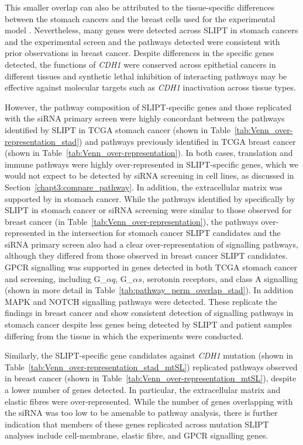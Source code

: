 This smaller overlap can also be attributed to the tissue-specific differences between the stomach cancers and the breast cells used for the experimental model \citep{Chen2014}. Nevertheless, many genes were detected across SLIPT in stomach cancers and the experimental screen \citep{Telford2015} and the pathways detected were consistent with prior observations in breast cancer. Despite differences in the specific genes detected, the functions of \textit{CDH1} were conserved across epithetial cancers in different tissues and synthetic lethal inhibition of interacting pathways may be effective against molecular targets such as \textit{CDH1} inactivation across tissue types.

However, the pathway composition of SLIPT-specific genes and those replicated with the siRNA primary screen \citep{Telford2015} were highly concordant between the pathways identified by SLIPT in TCGA stomach cancer (shown in Table~\ref{tab:Venn_over-representation_stad}) and pathways previously identified in TCGA breast cancer (shown in Table~\ref{tab:Venn_over-representation}). In both cases, translation and immune pathways were highly over-represented in SLIPT-specific genes, which we would not expect to be detected by siRNA screening in cell lines, as discussed in Section~\ref{chapt3:compare_pathway}. In addition, the extracellular matrix was supported by in stomach cancer. While the pathways identified by specifically by SLIPT in stomach cancer or siRNA screening were similar to those observed for breast cancer (in Table~\ref{tab:Venn_over-representation}), the pathways over-represented in the intersection for stomach cancer SLIPT candidates and the siRNA primary screen \citep{Telford2015} also had a clear over-representation of signalling pathways, although they differed from those observed in breast cancer SLIPT candidates. GPCR signalling was supported in genes detected in both TCGA stomach cancer and screening, including G_${\alpha q}$, G_${\alpha s}$, serotonin receptors, and class A signalling (shown in more detail in Table~\ref{tab:pathway_perm_overlap_stad}). In addition MAPK and NOTCH signalling pathways were detected. These replicate the findings in breast cancer and show consistent detection of signalling pathways in stomach cancer despite less genes being detected by SLIPT and patient samples differing from the tissue in which the experiments were conducted.

Similarly, the SLIPT-specific gene candidates against \textit{CDH1} mutation (shown in Table~\ref{tab:Venn_over-representation_stad_mtSL}) replicated pathways observed in breast cancer (shown in Table~\ref{tab:Venn_over-representation_mtSL}), despite a lower number of genes detected. In particular, the extracellular matrix and elastic fibres were over-represented. While the number of genes overlapping with the siRNA was too low to be amenable to pathway analysis, there is further indication that members of these genes replicated across mutation SLIPT analyses include cell-membrane, elastic fibre, and GPCR signalling genes. 

